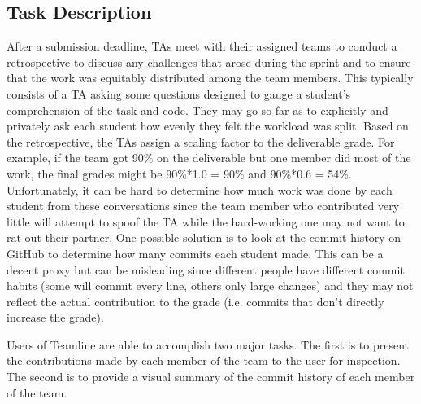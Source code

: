 \documentclass[../manifest.tex]{subfiles}
\begin{document}
\subsection{Task Description}

After a submission deadline, TAs meet with their assigned
teams to conduct a retrospective to discuss any challenges that arose
during the sprint and to ensure that the work was equitably distributed among the
team members. This typically consists of a TA asking some questions designed to
gauge a student's comprehension of the task and code. They may go so far as to
explicitly and privately ask each student how evenly they felt the workload was
split. Based on the retrospective, the TAs assign a scaling factor to the deliverable grade. For example, if
the team got 90\% on the deliverable but one member did most of the work, the final
grades might be 90\%*1.0 = 90\% and 90\%*0.6 = 54\%. Unfortunately, it can be hard
to determine how much work was done by each student from these conversations since
the team member who contributed very little will attempt to spoof the TA while the
hard-working one may not want to rat out their partner. One possible solution is
to look at the commit history on GitHub to determine how many commits each student
made. This can be a decent proxy but can be misleading since different people have
different commit habits (some will commit every line, others only large changes)
and they may not reflect the actual contribution to the grade (i.e. commits that
don't directly increase the grade).



Users of Teamline are able to accomplish two major tasks. The first is to present the contributions made by each member of the team to the user for inspection. The second is to provide a visual summary of the commit history of each member of the team.
\end{document}
